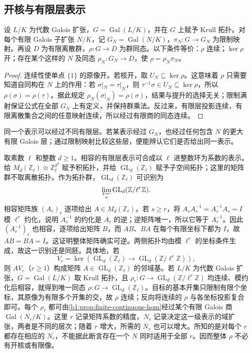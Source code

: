 \subsection{开核与有限层表示}
\label{b1:subsec:2205:03}
\begin{proposition}\label{b1:prop:finite-continuous-hom}
	设 \(L/K\) 为代数 Galois 扩张，\(G=\operatorname{Gal}(L/K)\)，并在 \(G\) 上赋予 Krull 拓扑。对每个有限 Galois 子扩张 \(N/K\)，记 \(G_N=\operatorname{Gal}(N/K)\)，\(\pi_N:G\rightarrow G_N\) 为限制映射。再设 \(D\) 为有限离散群，\(\rho:G\rightarrow D\) 为群同态。以下条件等价：\(\rho\) 连续；\(\ker\rho\) 开；存在某个这样的 \(N\) 及同态 \(\rho_N:G_N\rightarrow D\)，使 \(\rho=\rho_N\pi_N\)。
\end{proposition}
\begin{proof}
	连续性使单点 \(\{1\}\) 的原像开。若核开，取 \(U_N\subseteq\ker\rho\)。这意味着 \(\rho\) 只需要知道自同构在 \(N\) 上的作用：若 \(\sigma|_N=\tau|_N\)，则 \(\tau^{-1}\sigma\in U_N\subseteq\ker\rho\)，所以 \(\rho(\sigma)=\rho(\tau)\)。据此规定 \(\rho_N(\sigma|_N)=\rho(\sigma)\)，结果与提升的选择无关；限制满射保证公式在全部 \(G_N\) 上有定义，并保持群乘法。反过来，有限层投影连续，有限离散集合之间的任意映射连续，所以经过有限商的同态连续。
\end{proof}
同一个表示可以经过不同有限层。若某表示经过 \(G_N\)，也经过任何包含 \(N\) 的更大有限 Galois 层；通过限制映射比较这些层，便能辨认它们是否给出同一表示。

\ProseParagraphBreak
取素数 \(\ell\) 和整数 \(d\geq1\)。相容的有限层表示可合成以 \(\ell\) 进整数环为系数的表示。给 \(M_d(\mathbb Z_\ell)\cong\mathbb Z_\ell^{d^2}\) 赋予积拓扑，并给 \(\operatorname{GL}_d(\mathbb Z_\ell)\) 赋予子空间拓扑；这里的矩阵群不取离散拓扑。作为拓扑群，\(\operatorname{GL}_d(\mathbb Z_\ell)\) 可识别为
\[
	\varprojlim_r\operatorname{GL}_d(\mathbb Z/\ell^r\mathbb Z).
\]
相容矩阵族 \((A_r)_r\) 逐项给出 \(A\in M_d(\mathbb Z_\ell)\)。若 \(s\ge r\)，将 \(A_sA_s^{-1}=A_s^{-1}A_s=I\) 模 \(\ell^r\) 约化，说明 \(A_s^{-1}\) 的约化是 \(A_r\) 的逆；逆矩阵唯一，所以它等于 \(A_r^{-1}\)。因此 \((A_r^{-1})_r\) 也相容，逐项给出矩阵 \(B\)，而 \(AB\)、\(BA\) 在每个有限坐标下都为 \(I\)，故 \(AB=BA=I\)。这证明整体矩阵确实可逆。两侧拓扑均由模 \(\ell^r\) 的坐标条件生成，故这一识别还是同胚。具体地，若
\[
	V_r=\ker\!\left(\operatorname{GL}_d(\mathbb Z_\ell) \longrightarrow\operatorname{GL}_d(\mathbb Z/\ell^r\mathbb Z)\right),
\]
则 \(AV_r\)（\(r\geq1\)）构成矩阵 \(A\in\operatorname{GL}_d(\mathbb Z_\ell)\) 的邻域基。若 \(L/K\) 为代数 Galois 扩张，\(G=\operatorname{Gal}(L/K)\) 取 Krull 拓扑，且 \(\rho_r:G\rightarrow\operatorname{GL}_d(\mathbb Z/\ell^r\mathbb Z)\) 均连续、模约化后相容，就得到唯一同态 \(\rho:G\rightarrow\operatorname{GL}_d(\mathbb Z_\ell)\)。目标的基本开集只限制有限个坐标，其原像为有限多个开集的交，故 \(\rho\) 连续；反向将连续的 \(\rho\) 与各坐标投影复合即可。每个 \(\rho_r\) 都可由\cref{b1:prop:finite-continuous-hom}经过某个有限 Galois 商 \(\operatorname{Gal}(N_r/K)\)。这里 \(r\) 记录矩阵系数的精度，\(N_r\) 记录决定这一级表示的域扩张，两者是不同的层次；随着 \(r\) 增大，所需的 \(N_r\) 也可以增大。所知的是对每个 \(r\) 都存在相应的 \(N_r\)，不能据此断言存在一个 \(N\) 同时适用于全部 \(r\)。因而整体 \(\rho\) 不必有开核或有限像。

